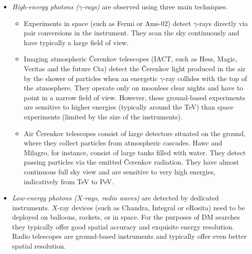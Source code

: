 \begin{itemize}
\item[$\circ$] {\em High-energy photons ($\gamma$-rays)} are observed using three main techniques. 
\begin{itemize}
\item Experiments in space (such as {\sc Fermi} or {\sc Ams-02}) detect $\gamma$-rays directly via pair conversions in the instrument. They scan the sky continuously and have typically a large field of view. 
\item Imaging atmospheric \v Cerenkov telescopes (IACT, such as {\sc Hess}, {\sc Magic}, {\sc Veritas} and the future {\sc Cta}) detect the \v Cerenkov light produced in the air by the shower of particles  when an energetic $\gamma$-ray collides with the top of the atmosphere.  They operate only on moonless clear nights and have to point in a narrow field of view. However, these ground-based experiments are sensitive to higher energies (typically around the TeV)
than space experiments (limited by the size of the instruments).
\item Air \v Cerenkov telescopes consist of large detectors situated on the ground, where they collect  particles from atmospheric cascades. {\sc Hawc} and {\sc Milagro}, for instance, consist of large tanks filled with water. They detect passing particles via the emitted \v Cerenkov radiation. They have almost continuous full sky view and are sensitive to very high energies, indicatively from TeV to PeV. 
\end{itemize}


\item[$\circ$] {\em Low-energy photons ($X$-rays, radio waves)} are detected by dedicated instruments. $X$-ray devices (such as {\sc Chandra}, {\sc Integral} or {\sc eRosita}) need to be deployed on balloons, rockets, or in space. For the purposes of DM searches they typically offer good spatial accuracy and exquisite energy resolution. Radio telescopes are ground-based instruments  and typically offer even better spatial resolution.


\end{itemize}
